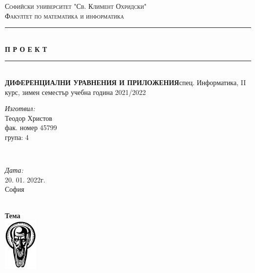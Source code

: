 \documentclass[12pt]{article}
\begin{document}
\begin{titlepage}	
	\newcommand{\HRule}{\rule{\linewidth}{0.5mm}} %
	\center %
	\textsc{\LARGE Софийски университет "Св. Климент Охридски" }\\[0.3cm]
	\textsc{\Large Факултет по математика и информатика }\\[0.2cm]
	\HRule \\[0.8cm] {\fontsize{50}{80}\selectfont \bf П Р О Е К Т} \\[0.1cm] \HRule \\[1cm]
	{\fontsize{12}{18}\selectfont \bf ДИФЕРЕНЦИАЛНИ УРАВНЕНИЯ И ПРИЛОЖЕНИЯ}\vspace{15pt}\newline спец. Информатика, II курс, зимен семестър \newline учебна година 2021/2022 
	\vspace{30pt}
		
		
		
		\begin{minipage}{0.4\textwidth}
			\begin{flushleft}\large
				\emph{Изготвил:} \\
				Теодор Христов \\ 
				фак. номер 45799 \\ 
				група: 4 %
			\end{flushleft}
		\end{minipage}
		~
		\begin{minipage}{0.4\textwidth}
			\begin{flushright}
				\large
				\emph{Дата:}\\
				20. 01.  2022г. %
				\\София 
			\end{flushright}
		\end{minipage}\\[1cm]
		\bigskip
		{\large \textbf{Тема }}\\[1cm] %
		\includegraphics{logo_su_no_text.png}\\[1cm]
		\vfill %
\end{titlepage}
\tableofcontents
\newpage
\end{document}
